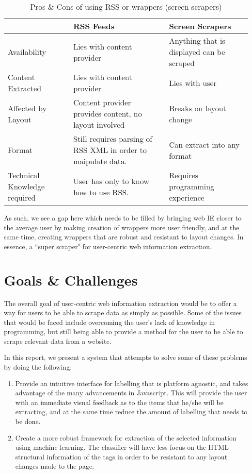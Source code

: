 \begin{table}[t]
\centering
\singlespacing
\small
\begin{tabular}{|p{3cm}|p{5cm}|p{5cm}|}
\hline
					&	RSS Feeds	&	Screen Scrapers \\
\hline
\hline
	Availability	&
	Lies with content provider &
	Anything that is displayed can be scraped \\
\hline
	Content Extracted &
	Lies with content provider &
	Lies with user \\
\hline
	Affected by Layout &
	Content provider provides content, no layout involved &
	Breaks on layout change \\
\hline
	Format &
	Still requires parsing of RSS XML in order to maipulate data. &
	Can extract into any format \\
\hline
	Technical Knowledge required &
	User has only to know how to use RSS. &
	Requires programming experience \\
	\hline
\end{tabular}
\caption{Pros \& Cons of using RSS or wrappers (screen-scrapers)}
\label{tab:template}
\end{table}


As such, we see a gap here which needs to be filled by bringing web IE closer to the average
user by making creation of wrappers more user friendly, and at the same time, creating wrappers
that are robust and resistant to layout changes. In essence, a ``super scraper" for
user-centric web information extraction.

\section{Goals \& Challenges}
The overall goal of user-centric web information extraction would be to offer a way for users
to be able to scrape data as simply as possible. Some of the issues that would be faced include
overcoming the user's lack of knowledge in programming, but still being able to provide a method
for the user to be able to scrape relevant data from a website.

In this report, we present a system that attempts to solve some of these problems by doing the
following:
	\begin{enumerate}
		\item Provide an intuitive interface for labelling that is platform agnostic, and takes
		 advantage of the many advancements in Javascript. This will provide the user with an
		 immediate visual feedback as to the items that he/she will be extracting, and at the
		 same time reduce the amount of labelling that needs to be done.
		\item Create a more robust framework for extraction of the selected information using
		machine learning. The classifier will have less focus on the HTML structural
		information of the tags in order to be resistant to any layout changes made to the page.
	\end{enumerate}

